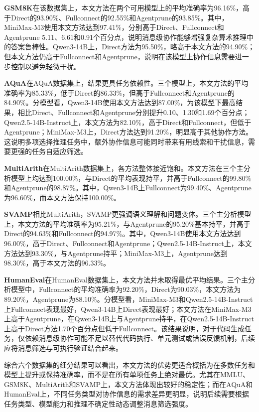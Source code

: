 \documentclass[11pt, a4paper]{article}
\numberwithin{figure}{section}
\begin{document}
\textbf{GSM8K}在该数据集上，本文方法在两个可用模型上的平均准确率为96.16\%，高于Direct的93.90\%、Fullconnect的92.55\%和Agentprune的93.85\%。其中，MiniMax-M3使用本文方法达到97.41\%，分别高于Direct、Fullconnect和Agentprune 5.11、6.61和0.91个百分点，说明消息级协作能够增强复杂算术推理中的答案鲁棒性。Qwen3-14B上，Direct方法为95.50\%，略高于本文方法的94.90\%；但本文方法仍高于Fullconnect和Agentprune，说明在该模型上协作信息需要进一步控制以避免轻微干扰。

\textbf{AQuA}在AQuA数据集上，结果更具任务依赖性。三个模型上，本文方法的平均准确率为85.33\%，低于Direct的86.33\%，但高于Fullconnect和Agentprune的84.90\%。分模型看，Qwen3-14B使用本文方法达到87.00\%，为该模型下最高结果，相比Direct、Fullconnect和Agentprune分别提升0.10、1.30和1.69个百分点；Qwen2.5-14B-Instruct上，本文方法为82.10\%，高于Direct和Fullconnect，但低于Agentprune；MiniMax-M3上，Direct方法达到91.20\%，明显高于其他协作方法。这说明多项选择推理任务中，额外协作信息可能同时带来有用线索和干扰信息，需要更强的任务自适应筛选。

\textbf{MultiArith}在MultiArith数据集上，各方法整体接近饱和。本文方法在三个主分析模型上均达到100.00\%，与Direct的平均表现持平，并高于Fullconnect的99.80\%和Agentprune的98.87\%。其中，Qwen3-14B上Fullconnect为99.40\%、Agentprune为96.60\%，而本文方法保持100.00\%。

\textbf{SVAMP}相比MultiArith，SVAMP更强调语义理解和问题变体。三个主分析模型上，本文方法的平均准确率为95.21\%，与Agentprune的95.20\%基本持平，并高于Direct的94.63\%和Fullconnect的94.97\%。其中，Qwen3-14B使用本文方法达到96.00\%，高于Direct、Fullconnect和Agentprune；Qwen2.5-14B-Instruct上，本文方法达到93.30\%，与Agentprune持平；MiniMax-M3上，Agentprune达到98.30\%，高于本文方法的96.33\%。

\textbf{HumanEval}在HumanEval数据集上，本文方法并未取得最优平均结果。三个主分析模型中，Fullconnect的平均准确率为92.20\%，Direct为90.03\%，本文方法为89.20\%，Agentprune为88.10\%。分模型看，MiniMax-M3和Qwen2.5-14B-Instruct上Fullconnect表现最好，Qwen3-14B上Direct表现最好；本文方法在MiniMax-M3上高于Agentprune，在Qwen3-14B上与Agentprune持平，在Qwen2.5-14B-Instruct上高于Direct方法1.70个百分点但低于Fullconnect。该结果说明，对于代码生成任务，仅依赖消息级协作可能不足以替代代码执行、单元测试或错误反馈机制，后续应将消息筛选与可执行验证结合起来。

综合六个数据集的细分结果可以看出，本文方法的优势更适合概括为在多数任务和模型上提升或保持准确率，而不是在所有单项任务上绝对最优。尤其在MMLU、GSM8K、MultiArith和SVAMP上，本文方法体现出较好的稳定性；而在AQuA和HumanEval上，不同任务类型对协作信息的需求差异更明显，说明后续需要根据任务类型、模型能力和推理不确定性动态调整消息筛选强度。
\end{document}
